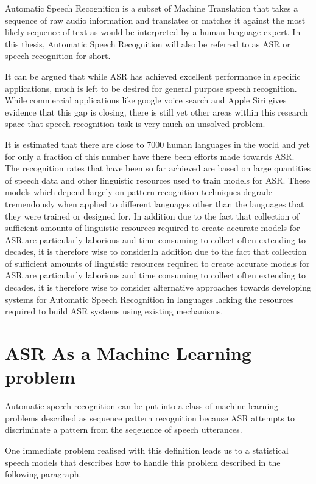 Automatic Speech Recognition is a subset of Machine Translation that takes a sequence of raw audio information and translates or matches it against the most likely sequence of text as would be interpreted by a human language expert.  In this thesis, Automatic Speech Recognition will also be referred to as 
ASR or speech recognition for short.

It can be argued that while ASR has achieved excellent performance in specific applications, much is left to be desired for general purpose speech recognition. While commercial applications like google voice search and Apple Siri gives evidence that this gap is closing, there is still yet other areas within this research space that speech recognition task is very much an unsolved problem.

It is estimated that there are close to 7000 human languages in the world and yet for only a fraction of this number have there been efforts made towards ASR.  The recognition rates that have been so far achieved are based on large quantities of speech data and other linguistic resources used to train models for ASR. These models which depend largely on pattern recognition techniques degrade tremendously  when applied to different languages other than the languages that they were trained or designed for.  In addition due to the fact that collection of sufficient amounts of linguistic resources required to create accurate models for ASR are particularly laborious and time consuming to collect often extending to decades, it is therefore wise to considerIn addition due to the fact that collection of sufficient amounts of linguistic resources required to create accurate models for ASR are particularly laborious and time consuming to collect often extending to decades, it is therefore wise to consider alternative approaches towards developing systems for Automatic Speech Recognition in languages lacking the resources required to build ASR systems using existing mechanisms.

\section{ASR As a Machine Learning  problem}
\pagestyle{plain}
Automatic speech recognition can be put into a class of machine learning problems described as sequence pattern recognition because ASR attempts to discriminate a pattern from the seqeuence of speech utterances. 

One immediate problem realised with this definition leads us to a statistical speech models that describes how to handle this problem described in the following paragraph.


